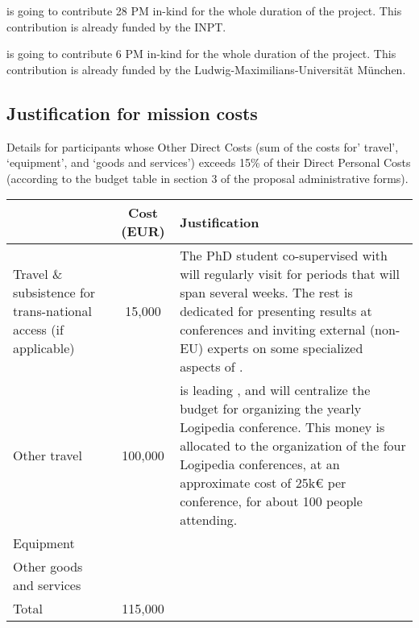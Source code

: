  is going to contribute 28 PM in-kind for the whole duration of the project.
This contribution is already funded by the INPT.

 is going to contribute 6 PM in-kind for the whole duration of the project.
This contribution is already funded by the Ludwig-Maximilians-Universit\"at M\"unchen.

\subsection*{Justification for mission costs}

Details for participants whose Other Direct Costs (sum of the costs
for’ travel’, ‘equipment’, and ‘goods and services’) exceeds 15\% of
their Direct Personal Costs (according to the budget table in section
3 of the proposal administrative forms).

\begin{longtable*}{|p{.25\textwidth}|c|p{0.55\textwidth}|}
\hline
   & Cost (EUR)  & Justification \\
  \hline
  Travel \& subsistence for trans-national access (if applicable) & 15,000 &

  The PhD student co-supervised with  will regularly visit
   for periods that will span several weeks.
  The rest is dedicated for
  presenting results at conferences and inviting external (non-EU) experts
  on some specialized aspects of .\\
  \hline
  Other travel & 100,000 &
   is leading , and will centralize the
  budget for organizing the yearly Logipedia conference. This money is
  allocated to the organization of the four Logipedia conferences, at an
  approximate cost of 25k€ per conference, for about 100 people attending.
   \\
  \hline
  Equipment & & \\
  \hline
  Other goods and services & & \\
  \hline
  Total & 115,000 & \\
  \hline
\end{longtable*}

